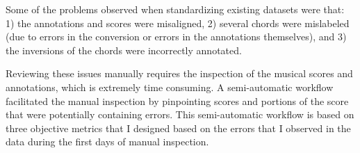 
Some of the problems observed when standardizing existing
datasets were that: 1) the annotations and scores were
misaligned, 2) several chords were mislabeled (due to errors
in the conversion or errors in the annotations themselves),
and 3) the inversions of the chords were incorrectly
annotated.

Reviewing these issues manually requires the inspection of
the musical scores and annotations, which is extremely time
consuming. A semi-automatic workflow facilitated the manual
inspection by pinpointing scores and portions of the score
that were potentially containing errors. This semi-automatic
workflow is based on three objective metrics that I designed
based on the errors that I observed in the data during the
first days of manual inspection.
